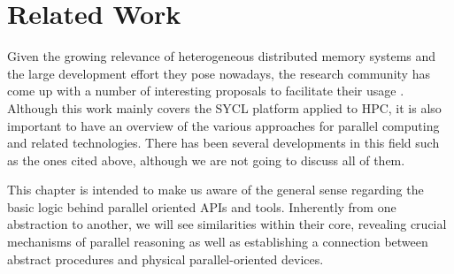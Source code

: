 %
%
%

\cleardoublepage
\chapter{Related Work} \label{chap:Related_Technologies}

Given the growing relevance of heterogeneous distributed memory systems and the large
development effort they pose nowadays, the research community has come up with a number of
interesting proposals to facilitate their usage \cite{Agullo:2017:Achieving, Sainz:2014:Leveraging,Lawlor:2009:Message,Stone:2010:OpenCL,Kim:2012:SnuCL}.
Although this work mainly covers the SYCL platform applied to HPC, it is also important to have an overview of the various approaches for parallel computing and related technologies.
There has been several developments in this field such as the ones cited above, although we are not going to discuss all of them.

This chapter is intended to make us aware of the general sense regarding the basic logic behind parallel oriented APIs and tools.
Inherently from one abstraction to another, we will see similarities within their core, revealing crucial mechanisms of parallel reasoning as well as establishing a connection between abstract procedures and physical parallel-oriented devices.

